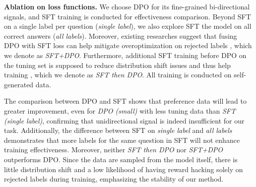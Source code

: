 \textbf{Ablation on loss functions.} We choose DPO for its fine-grained bi-directional signals, and SFT training is conducted for effectiveness comparison. Beyond SFT on a single label per question (\textit{single label}), we also explore SFT the model on all correct answers (\textit{all labels}). Moreover, existing researches suggest that fusing DPO with SFT loss can help mitigate overoptimization on rejected labels \citep{he2024complex, liu2024provably}, which we denote as \textit{SFT+DPO}. Furthermore, additional SFT training before DPO on the tuning set is supposed to reduce distribution shift issues and thus help training \citep{xu2024dpo}, which we denote as \emph{SFT then DPO}. All training is conducted on self-generated data. 

The comparison between DPO and SFT shows that preference data will lead to greater improvement, even for \textit{DPO (small)} with less tuning data than \textit{SFT (single label)}, confirming that unidirectional signal is indeed insufficient for our task. Additionally, the difference between SFT on \textit{single label} and \textit{all labels} demonstrates that more labels for the same question in SFT will not enhance training effectiveness. Moreover, neither \textit{SFT then DPO} nor \textit{SFT+DPO} outperforms DPO. Since the data are sampled from the model itself, there is little distribution shift and a low likelihood of having reward hacking solely on rejected labels during training, emphasizing the stability of our method.

\begin{table}[!t]
  \centering
  \caption{Results after training on different losses.}
  \label{tab:loss ablation}
\end{table}

